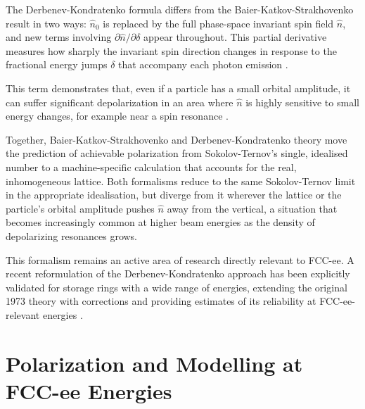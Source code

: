 \documentclass[%
 aip,
 amsmath,amssymb,
 reprint,%
superscriptaddress
]{revtex4-2}
\begin{document}
The Derbenev-Kondratenko formula differs from the Baier-Katkov-Strakhovenko result in two ways: $\hat{n}_0$ is replaced by the full phase-space invariant spin field $\hat{n}$, and new terms involving $\partial\hat{n}/\partial\delta$ appear throughout. This partial derivative measures how sharply the invariant spin direction changes in response to the fractional energy jumps $\delta$ that accompany each photon emission \cite{zara_berglund_2001}.

This term demonstrates that, even if a particle has a small orbital amplitude, it can suffer significant depolarization in an area where $\hat{n}$ is highly sensitive to small energy changes, for example near a spin resonance \cite{zara_berglund_2001}.

Together, Baier-Katkov-Strakhovenko and Derbenev-Kondratenko theory move the prediction of achievable polarization from Sokolov-Ternov's single, idealised number to a machine-specific calculation that accounts for the real, inhomogeneous lattice. Both formalisms reduce to the same Sokolov-Ternov limit in the appropriate idealisation, but diverge from it wherever the lattice or the particle's orbital amplitude pushes $\hat{n}$ away from the vertical, a situation that becomes increasingly common at higher beam energies as the density of depolarizing resonances grows.

This formalism remains an active area of research directly relevant to FCC-ee. A recent reformulation of the Derbenev-Kondratenko approach has been explicitly validated for storage rings with a wide range of energies, extending the original 1973 theory with corrections and providing estimates of its reliability at FCC-ee-relevant energies \cite{heinemann2026elaborationkineticapproachderbenev}.


\section{Polarization and Modelling at FCC-ee Energies}
\end{document}
